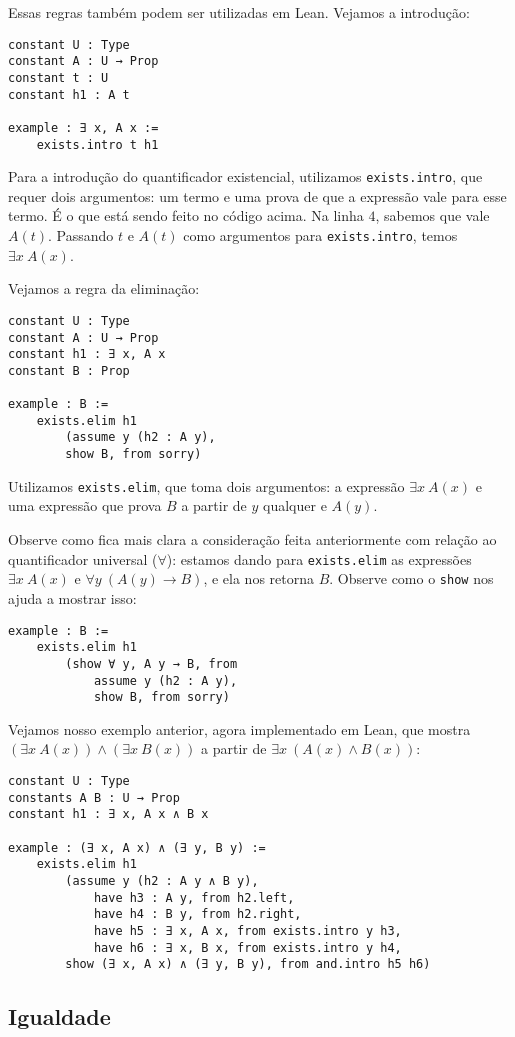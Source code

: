         Essas regras também podem ser utilizadas em Lean. Vejamos a introdução:

        \begin{lstlisting}
constant U : Type
constant A : U → Prop
constant t : U
constant h1 : A t

example : ∃ x, A x :=
    exists.intro t h1
\end{lstlisting}

        Para a introdução do quantificador existencial, utilizamos \lstinline{exists.intro}, que requer dois argumentos:
        um termo e uma prova de que a expressão vale para esse termo. É o que está sendo feito no código acima. Na linha $4$, sabemos que vale $A(t)$. Passando $t$ e $A(t)$
        como argumentos para \lstinline{exists.intro}, temos $\exists x \ A(x)$.

        Vejamos a regra da eliminação:

        \begin{lstlisting}
constant U : Type
constant A : U → Prop
constant h1 : ∃ x, A x
constant B : Prop

example : B :=
    exists.elim h1
        (assume y (h2 : A y),
        show B, from sorry)
\end{lstlisting}

        Utilizamos \lstinline{exists.elim}, que toma dois argumentos: a expressão $\exists x \ A(x)$ e uma expressão que prova $B$ a partir de $y$ qualquer e $A(y)$.
        
        Observe como fica mais clara a consideração feita anteriormente com relação ao quantificador universal ($\forall$): estamos dando para \lstinline{exists.elim} as expressões $\exists x \ A(x)$ e $\forall y \ (A(y) \to B)$, e ela nos retorna $B$. Observe como o \lstinline{show} nos ajuda a mostrar isso:

        \begin{lstlisting}
example : B :=
    exists.elim h1
        (show ∀ y, A y → B, from
            assume y (h2 : A y),
            show B, from sorry)
\end{lstlisting}

        Vejamos nosso exemplo anterior, agora implementado em Lean, que mostra $(\exists x \ A(x)) \land (\exists x \ B(x))$ a partir de $\exists x \ (A(x) \land B(x))$:
        \begin{lstlisting}
constant U : Type
constants A B : U → Prop
constant h1 : ∃ x, A x ∧ B x

example : (∃ x, A x) ∧ (∃ y, B y) :=
    exists.elim h1
        (assume y (h2 : A y ∧ B y),
            have h3 : A y, from h2.left,
            have h4 : B y, from h2.right,
            have h5 : ∃ x, A x, from exists.intro y h3,
            have h6 : ∃ x, B x, from exists.intro y h4,
        show (∃ x, A x) ∧ (∃ y, B y), from and.intro h5 h6)
\end{lstlisting}
\subsection{Igualdade}
